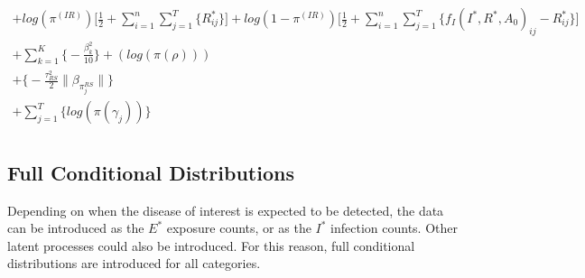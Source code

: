 \documentclass[12pt]{article}
\begin{document}
\begin{center}
\begin{multline}
            + log(\pi^{(IR)})\Big[\frac{1}{2} + \sum_{i=1}^n\sum_{j=1}^T\{R^*_{ij}\}\Big] + 
            log(1-\pi^{(IR)})\Big[\frac{1}{2} + \sum_{i=1}^n\sum_{j=1}^T\{ f_I(I^*, R^*, A_0)_{ij} - R^*_{ij}\}\Big]\\
            + \sum_{k = 1}^K\bigg\{-\frac{\beta^2_k}{10}\bigg\}
            + (log(\pi(\rho)))\\
            + \bigg\{ -\frac{\tau^2_{RS}}{2}\|\beta_{\pi_j^{RS}}\|  \bigg\} \\ 
            + \sum_{j=1}^{T} \bigg\{ log(\pi(\gamma_j)) \bigg\}\\
\end{multline}

\end{center}


\subsection{Full Conditional Distributions}
Depending on when the disease of interest is expected to be detected, the data can be 
introduced as the $E^*$ exposure counts, or as the $I^*$ infection counts. Other latent 
processes could also be introduced. For this reason, full conditional distributions are 
introduced for all categories. 
\end{document}
